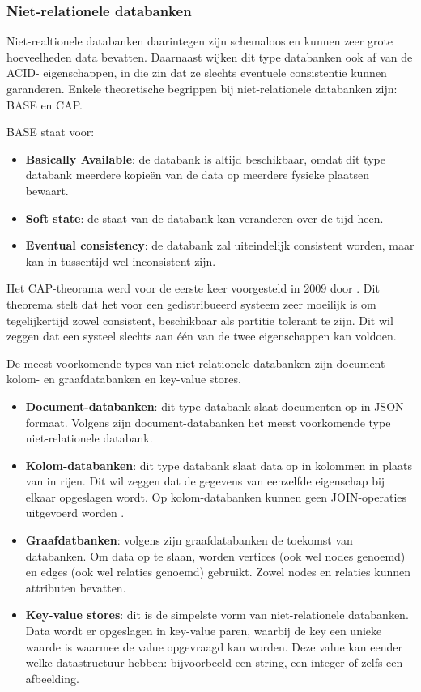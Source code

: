 \subsubsection{Niet-relationele databanken}
Niet-realtionele databanken daarintegen zijn schemaloos en kunnen zeer grote hoeveelheden data bevatten. Daarnaast wijken dit type databanken ook af van de ACID- eigenschappen, in die zin dat ze slechts eventuele consistentie kunnen garanderen. Enkele theoretische begrippen bij niet-relationele databanken zijn: BASE en CAP.

BASE staat voor:

\begin{itemize}
    \item \textbf{Basically Available}: de databank is altijd beschikbaar, omdat dit type databank meerdere kopieën van de data op meerdere fysieke plaatsen bewaart.
    \item \textbf{Soft state}: de staat van de databank kan veranderen over de tijd heen.
    \item \textbf{Eventual consistency}: de databank zal uiteindelijk consistent worden, maar kan in tussentijd wel inconsistent zijn.
\end{itemize}

Het CAP-theorama werd voor de eerste keer voorgesteld in 2009 door \textcite{Brewer}. Dit theorema stelt dat het voor een gedistribueerd systeem zeer moeilijk is om tegelijkertijd zowel consistent, beschikbaar als partitie tolerant te zijn. Dit wil zeggen dat een systeel slechts aan één van de twee eigenschappen kan voldoen.

De meest voorkomende types van niet-relationele databanken zijn document- kolom- en graafdatabanken en key-value stores.

\begin{itemize}
    \item \textbf{Document-databanken}: dit type databank slaat documenten op in JSON-formaat. Volgens \textcite{BRON15} zijn document-databanken het meest voorkomende type niet-relationele databank.
    \item \textbf{Kolom-databanken}: dit type databank slaat data op in kolommen in plaats van in rijen. Dit wil zeggen dat de gegevens van eenzelfde eigenschap bij elkaar opgeslagen wordt. Op kolom-databanken kunnen geen JOIN-operaties uitgevoerd worden \autocite{BRON15}.
    \item \textbf{Graafdatbanken}: volgens \textcite{10.21608/EJAI.2022.132961.1002} zijn graafdatabanken de toekomst van databanken. Om data op te slaan, worden vertices (ook wel nodes genoemd) en edges (ook wel relaties genoemd) gebruikt. Zowel nodes en relaties kunnen attributen bevatten. 
    \item \textbf{Key-value stores}: dit is de simpelste vorm van niet-relationele databanken. Data wordt er opgeslagen in key-value paren, waarbij de key een unieke waarde is waarmee de value opgevraagd kan worden. Deze value kan eender welke datastructuur hebben: bijvoorbeeld een string, een integer of zelfs een afbeelding.
\end{itemize}

